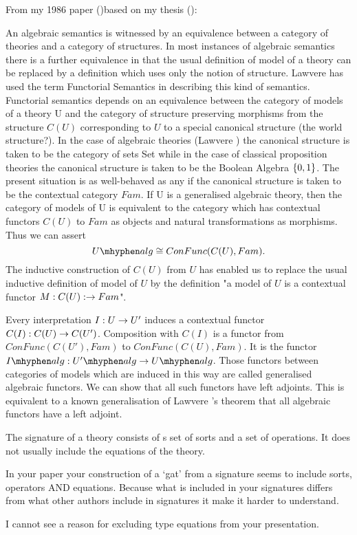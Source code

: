 \note From my 1986 paper (\cite{Cartmell86})based on my thesis (\cite{Cartmell78}):
\begin{tightquote}
An algebraic semantics is witnessed by an equivalence between a category of
theories and a category of structures. In most instances of algebraic semantics
there is a further equivalence in that the usual definition of model of a theory can
be replaced by a definition which uses only the notion of structure. Lawvere has
used the term Functorial Semantics in describing this kind of semantics.
Functorial semantics depends on an equivalence between the category of models
of a theory U and the category of structure preserving morphisms from the
structure $C(U)$ corresponding to $U$ to a special canonical structure (the world
structure?). In the case of algebraic theories (Lawvere \cite{LawvereAlgebraicTheories}) the canonical structure
is taken to be the category of sets Set while in the case of classical proposition
theories the canonical structure is taken to be the Boolean Algebra $\left\{0, 1\right\}$.
The present situation is as well-behaved as any if the canonical structure is
taken to be the contextual category $Fam$.
If U is a generalised algebraic theory, then the category of models of U is
equivalent to the category which has contextual functors $C(U)$ to $Fam$ as objects
and natural transformations as morphisms. Thus we can assert
\begin{equation*}
\Ualg \cong ConFunc(C(U), Fam).
\end{equation*}
The inductive construction of $C(U)$ from $U$ has enabled us to replace the usual 
inductive definition of model of $U$ by the definition "a model of $U$ is a contextual
functor $M: C(U): \rightarrow Fam$".

Every interpretation $I:U \rightarrow U'$ induces a contextual functor 
$C(I):C(U) \rightarrow C(U')$. Composition with $C(I)$ is a functor from 
$ConFunc(C(U'),Fam)$ to
$ConFunc(C(U),Fam)$. It is the functor $\Ialg:\Upalg \morph \Ualg$. Those functors
between categories of models which are induced in this way are called generalised
algebraic functors. We can show that all such functors have left adjoints. This is
equivalent to a known generalisation of Lawvere \cite{LawvereAlgebraicTheories}'s theorem that all algebraic
functors have a left adjoint. 
\end{tightquote}

\note
The signature of a theory consists of s set of sorts and a set of operations. It does not usually include the equations of the theory. 
\begin{notebox}
In your paper your construction of a `gat' from a signature seems to include sorts, operators AND equations. Because 
what is included in your signatures differs from what other authors include in signatures it make it harder to understand.
\end{notebox}
\begin{notebox} 
I cannot see a reason for excluding type equations from your presentation.
\end{notebox}

